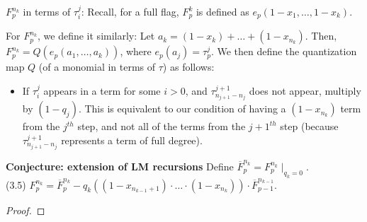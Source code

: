 \documentclass[11pt]{article}
\begin{document}




$F_p^{n_k}$ in terms of $\tau_i^j$: Recall, for a full flag, $F_p^k$ is defined as $e_p(1-x_1, \ldots, 1-x_k)$. 

For $F_p^{n_k}$, we define it similarly: Let $a_k = (1-x_k) + \ldots + (1-x_{n_k})$. Then,  $F_p^{n_k} = Q(e_p(a_1, \ldots, a_k))$, where $e_p(a_j) = \tau_p^j$. We then define the quantization map $Q$ (of a monomial in terms of $\tau$) as follows:
\begin{itemize}
    \item If $\tau_i^j$ appears in a term for some $i > 0$, and $\tau_{n_{j+1} - n_j}^{j+1}$ does not appear, multiply by $(1-q_j)$. This is equivalent to our condition of having a $(1-x_{n_k})$ term from the $j^{th}$ step, and not all of the terms from the $j+1^{th}$ step (because $\tau_{n_{j+1} - n_j}^{j+1}$ represents a term of full degree).
\end{itemize}

\textbf{Conjecture: extension of LM recursions}
Define $\overline{F}_p^{n_k} = F_p^{n_k} \mid_{q_{k} = 0}$. \\

(3.5) $F_p^{n_k} = \overline{F}_p^{n_k} - q_{k}\left((1-x_{n_{k-1}+1})\cdot \ldots \cdot (1-x_{n_k})\right) \cdot \overline{F}_{p-1}^{n_{k-1}}$.

\begin{proof}
    
\end{proof}
\end{document}
